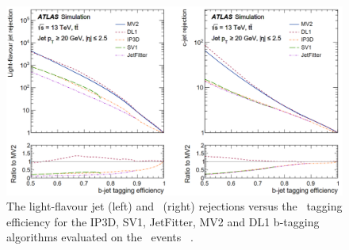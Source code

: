 \begin{figure}[bth]
	\includegraphics[width=.9\textwidth]{FTAG_plots/b-tagging-perfermance.png}
	\caption{The light-flavour jet (left) and \cjet\ (right) rejections versus 
	the \bjet\ tagging efficiency for the IP3D, SV1, JetFitter, MV2 and
	DL1 b-tagging algorithms evaluated on the \ttbar\ events
	~\cite{FTAG-2018-01}.}\label{fig:b-tagging-performance}
\end{figure}


